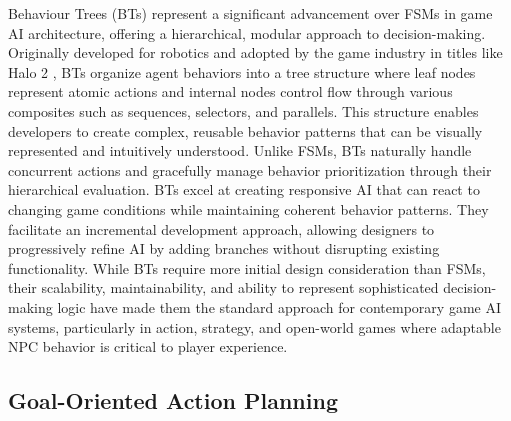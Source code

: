 Behaviour Trees (BTs) represent a significant advancement over FSMs in game AI architecture, offering a hierarchical, modular approach to decision-making. 
Originally developed for robotics and adopted by the game industry in titles like Halo 2 \cite{simulacrum}, BTs organize agent behaviors into a tree structure where leaf nodes represent atomic actions and internal nodes control flow through various composites such as sequences, selectors, and parallels. 
This structure enables developers to create complex, reusable behavior patterns that can be visually represented and intuitively understood. 
Unlike FSMs, BTs naturally handle concurrent actions and gracefully manage behavior prioritization through their hierarchical evaluation.
BTs excel at creating responsive AI that can react to changing game conditions while maintaining coherent behavior patterns. 
They facilitate an incremental development approach, allowing designers to progressively refine AI by adding branches without disrupting existing functionality.
While BTs require more initial design consideration than FSMs, their scalability, maintainability, and ability to represent sophisticated decision-making logic have made them the standard approach for contemporary game AI systems, particularly in action, strategy, and open-world games where adaptable NPC behavior is critical to player experience.

\subsection{Goal-Oriented Action Planning}

